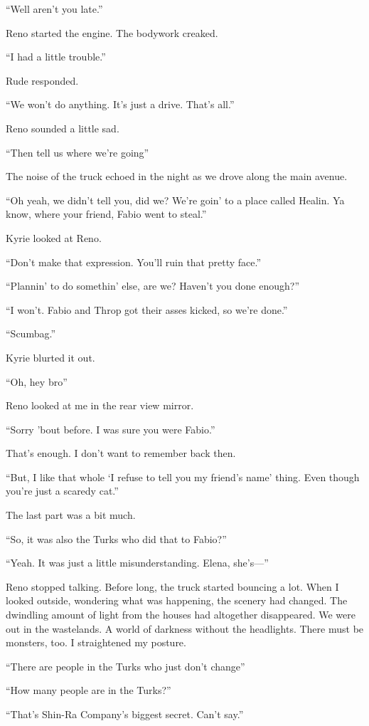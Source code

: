 \documentclass[oneside]{book}
\begin{document}
“Well aren’t you late.”

Reno started the engine. The bodywork creaked.

“I had a little trouble.”

Rude responded.

“We won’t do anything. It’s just a drive. That’s all.”

Reno sounded a little sad.

“Then tell us where we’re going”

The noise of the truck echoed in the night as we drove along the main avenue.

“Oh yeah, we didn’t tell you, did we? We’re goin’ to a place called Healin. Ya know, where your friend, Fabio went to steal.”

Kyrie looked at Reno.

“Don’t make that expression. You’ll ruin that pretty face.”

“Plannin’ to do somethin’ else, are we? Haven’t you done enough?”

“I won’t. Fabio and Throp got their asses kicked, so we’re done.”

“Scumbag.”

Kyrie blurted it out.

“Oh, hey bro”

Reno looked at me in the rear view mirror.

“Sorry ’bout before. I was sure you were Fabio.”

That’s enough. I don’t want to remember back then.

“But, I like that whole ‘I refuse to tell you my friend’s name’ thing. Even though you’re just a scaredy cat.”

The last part was a bit much.

“So, it was also the Turks who did that to Fabio?”

“Yeah. It was just a little misunderstanding. Elena, she’s—”

Reno stopped talking. Before long, the truck started bouncing a lot. When I looked outside, wondering what was happening, the scenery had changed. The dwindling amount of light from the houses had altogether disappeared. We were out in the wastelands. A world of darkness without the headlights. There must be monsters, too. I straightened my posture.

“There are people in the Turks who just don’t change”

“How many people are in the Turks?”

“That’s Shin-Ra Company’s biggest secret. Can’t say.”
\end{document}
